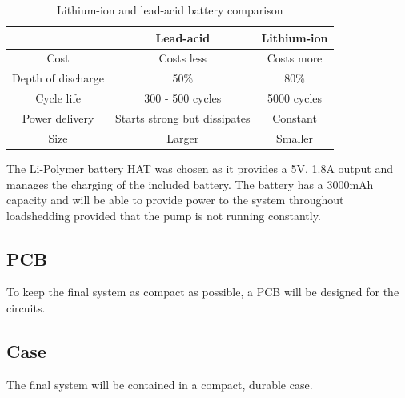 \begin{table}[!h]
    \centering
    \begin{tabular}{|c||c|c|}
        \hline
         &  Lead-acid & Lithium-ion \\
        \hline
        Cost & Costs less & Costs more \\
        Depth of discharge \cite{battery_10_diff} & 50\% & 80\% \\
        Cycle life \cite{battery_10_diff} & 300 - 500 cycles & 5000 cycles \\
        Power delivery \cite{battery_guide} & Starts strong but dissipates & Constant \\
        Size \cite{battery_10_diff} & Larger & Smaller \\
        \hline
    \end{tabular}
    \caption{Lithium-ion and lead-acid battery comparison}
    \label{tab:battery_comp}
\end{table}

The Li-Polymer battery HAT was chosen as it provides a 5V, 1.8A output \cite{battery_faq} and manages the charging of the included battery. The battery has a 3000mAh capacity and will be able to provide power to the system throughout loadshedding provided that the pump is not running constantly.

\subsection{PCB}
To keep the final system as compact as possible, a PCB will be designed for the circuits.

\subsection{Case}
The final system will be contained in a compact, durable case.